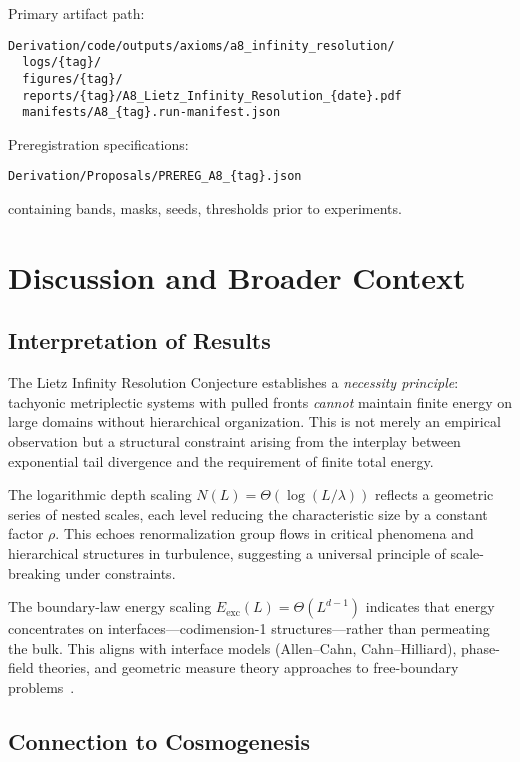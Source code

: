 \documentclass{article}
\begin{document}
Primary artifact path:
\begin{verbatim}
Derivation/code/outputs/axioms/a8_infinity_resolution/
  logs/{tag}/
  figures/{tag}/
  reports/{tag}/A8_Lietz_Infinity_Resolution_{date}.pdf
  manifests/A8_{tag}.run-manifest.json
\end{verbatim}

Preregistration specifications:
\begin{verbatim}
Derivation/Proposals/PREREG_A8_{tag}.json
\end{verbatim}
containing bands, masks, seeds, thresholds prior to experiments.

\section{Discussion and Broader Context}
\label{sec:discussion}

\subsection*{Interpretation of Results}

The Lietz Infinity Resolution Conjecture establishes a \emph{necessity principle}: tachyonic metriplectic systems with pulled fronts \emph{cannot} maintain finite energy on large domains without hierarchical organization. This is not merely an empirical observation but a structural constraint arising from the interplay between exponential tail divergence and the requirement of finite total energy.

The logarithmic depth scaling $N(L) = \Theta(\log(L/\lambda))$ reflects a geometric series of nested scales, each level reducing the characteristic size by a constant factor $\rho$. This echoes renormalization group flows in critical phenomena and hierarchical structures in turbulence, suggesting a universal principle of scale-breaking under constraints.

The boundary-law energy scaling $E_{\text{exc}}(L) = \Theta(L^{d-1})$ indicates that energy concentrates on interfaces---codimension-1 structures---rather than permeating the bulk. This aligns with interface models (Allen--Cahn, Cahn--Hilliard), phase-field theories, and geometric measure theory approaches to free-boundary problems~\cite{modica1977gradient,gurtin1996generalized}.

\subsection*{Connection to Cosmogenesis}
\end{document}
